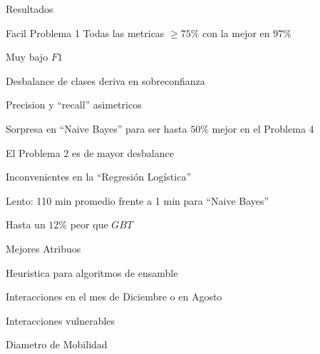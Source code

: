 \documentclass[xcolor=x11names]{beamer}
\begin{document}
\begin{frame}{Resultados}
	
	\begin{block}{Facil Problema 1}
		Todas las metricas $\geq 75\%$ con la mejor en $97\%$
	\end{block}

	\begin{block}{Muy bajo $F1$}
		\begin{enumerate*}[label={\alph*)},]
			\item Desbalance de clases deriva en sobreconfianza
			\item Precision y ``recall'' asimetricos
			\item Sorpresa en ``Naive Bayes'' para ser hasta $50\%$ mejor en el Problema 4
			\item El Problema 2 es de mayor desbalance
		\end{enumerate*}
	\end{block}

\begin{block}{Inconvenientes en la ``Regresión Logística''}
	\begin{enumerate*}[label={\alph*)},]
		\item Lento: 110 min promedio frente a 1 min para ``Naive Bayes''
		\item Hasta un $12\%$ peor que $GBT$ 
	\end{enumerate*}
\end{block}

\end{frame}


\begin{frame}{Mejores Atribuos}
	
		Heuristica para algoritmos de ensamble
		
		\begin{enumerate*}[label={\alph*)},]
			\item Interacciones en el mes de Diciembre o en Agosto
			\item Interacciones vulnerables
			\item Diametro de Mobilidad
		\end{enumerate*}


\end{frame}
\end{document}
